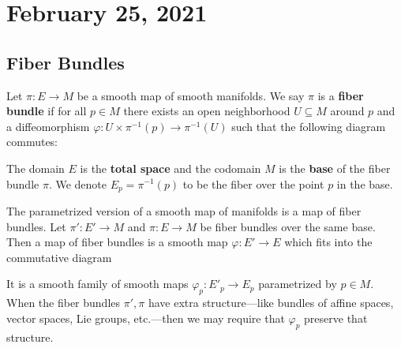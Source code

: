 \section{February 25, 2021}
\subsection{Fiber Bundles}
\begin{definition}[]
    Let $\pi \colon E \to M$ be a smooth map of smooth manifolds. We say $\pi $ is a \textbf{fiber bundle} if for all $p \in M$ there exists an open neighborhood $U \subseteq M$ around $p$ and a diffeomorphism $\varphi \colon U\times \pi ^{-1} (p)\to \pi ^{-1}(U)$ such that the following diagram commutes:
    \begin{figure}[H]
    \centering
    \end{figure}
    The domain $E$ is the \textbf{total space} and the codomain $M$ is the \textbf{base} of the fiber bundle $\pi$. We denote $E_p= \pi ^{-1}(p)$ to be the fiber over the point $p$ in the base.
\end{definition}
The parametrized version of a smooth map of manifolds is a map of fiber bundles. Let $\pi' \colon E' \to M$ and $\pi \colon E \to M$ be fiber bundles over the same base. Then a map of fiber bundles is a smooth map $\varphi \colon E' \to E$ which fits into the commutative diagram
\begin{figure}[H]
\centering
{}
\end{figure}
It is a smooth family of smooth maps $\varphi _p \colon E'_p \to E_p$ parametrized by $p \in M$. When the fiber bundles $\pi',\pi$ have extra structure---like bundles of affine spaces, vector spaces, Lie groups, etc.---then we may require that $\varphi _p$ preserve that structure.
